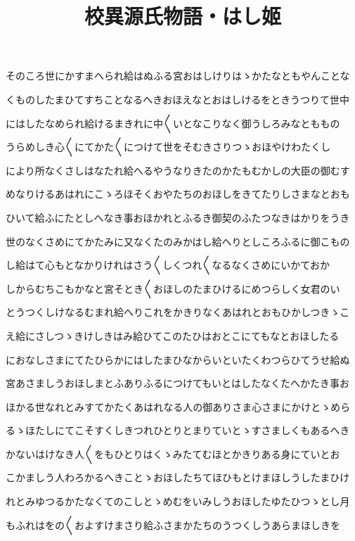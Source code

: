 \documentclass[a4paper,11pt,landscape]{ltjtarticle}
\title{校異源氏物語・はし姬}
\date{}
\begin{document}
\maketitle

そのころ世にかすまへられ給はぬふる宮おはしけりはゝかたなともやんことな
\par\medskip
くものしたまひてすちことなるへきおほえなとおはしけるをときうつりて世中
\par\medskip
にはしたなめられ給けるまきれに中〱いとなこりなく御うしろみなとももの
\par\medskip
うらめしき心〱にてかた〱につけて世をそむきさりつゝおほやけわたくし
\par\medskip
により所なくさしはなたれ給へるやうなりきたのかたもむかしの大臣の御むす
\par\medskip
めなりけるあはれにこゝろほそくおやたちのおほしをきてたりしさまなとおも
\par\medskip
ひいて給ふにたとしへなき事おほかれとふるき御契のふたつなきはかりをうき
\par\medskip
世のなくさめにてかたみに又なくたのみかはし給へりとしころふるに御こもの
\par\medskip
し給はて心もとなかりけれはさう〱しくつれ〱なるなくさめにいかておか
\par\medskip
しからむちこもかなと宮そとき〱おほしのたまひけるにめつらしく女君のい
\par\medskip
とうつくしけなるむまれ給へりこれをかきりなくあはれとおもひかしつきゝこ
\par\medskip
え給にさしつゝきけしきはみ給ひてこのたひはおとこにてもなとおほしたる
\par\medskip
におなしさまにてたひらかにはしたまひなからいといたくわつらひてうせ給ぬ
\par\medskip
宮あさましうおほしまとふありふるにつけてもいとはしたなくたへかたき事お
\par\medskip
ほかる世なれとみすてかたくあはれなる人の御ありさま心さまにかけとゝめら
\par\medskip
るゝほたしにてこそすくしきつれひとりとまりていとゝすさましくもあるへき
\par\medskip
かないはけなき人〱をもひとりはくゝみたてむほとかきりある身にていとお
\par\medskip
こかましう人わろかるへきことゝおほしたちてほひもとけまほしうしたまひけ
\par\medskip
れとみゆつるかたなくてのこしとゝめむをいみしうおほしたゆたひつゝとし月
\par\medskip
もふれはをの〱およすけまさり給ふさまかたちのうつくしうあらまほしきを
\end{document}
